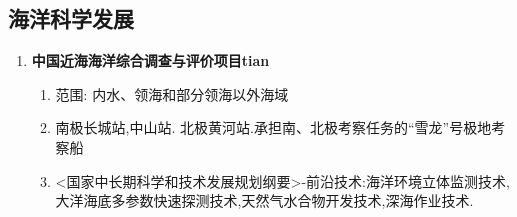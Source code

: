 \subsection{海洋科学发展}
\begin{enumerate}[1)]
	\item \textbf{中国近海海洋综合调查与评价项目tian}
		\begin{enumerate}
			\item 范围: 内水、领海和部分领海以外海域
			\item 南极长城站,中山站. 北极黄河站.承担南、北极考察任务的“雪龙”号极地考察船
			\item <国家中长期科学和技术发展规划纲要>-前沿技术:海洋环境立体监测技术,大洋海底多参数快速探测技术,天然气水合物开发技术,深海作业技术.
		\end{enumerate}
\end{enumerate}
